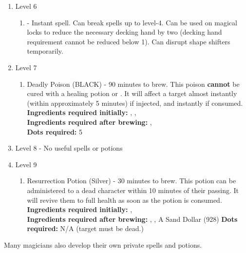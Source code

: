 \documentclass[green]{NeptuneBall}
\begin{document}
\begin{enumerate}
   \item Level 6
    \begin{enumerate}
      \item \aGreaterDispel{} - Instant spell. Can break spells up to level-4. Can be used on magical locks to reduce the necessary decking hand by two (decking hand requirement cannot be reduced below 1). Can disrupt shape shifters temporarily.
    \end{enumerate}
   \item Level 7
    \begin{enumerate}
      \item Deadly Poison (BLACK) - 90 minutes to brew. This poison {\bf cannot} be cured with a healing potion or \aFirstAid{}. It will affect a target almost instantly (within approximately 5 minutes) if injected, and instantly if consumed.\\
      {\bf Ingredients required initially:} \iIceFish{}, \iElectricEel{}, \iSwordfish{}\\
      {\bf Ingredients required after brewing:} \iSnails{}, \iDeepClam{}\\
		  {\bf Dots required:} 5
    \end{enumerate}
   \item Level 8 - No useful spells or potions
   \item Level 9
   	\begin{enumerate}
   	 \item Resurrection Potion (Silver) - 30 minutes to brew. This potion can be administered to a dead character within 10 minutes of their passing. It will revive them to full health as soon as the potion is consumed.\\
   	 {\bf Ingredients required initially:} \iSnails{}, \iPearl{}\\
   	 {\bf Ingredients required after brewing:} \iDrug{}, \iAnglerFish{}, A Sand Dollar (928)
   	 {\bf Dots required:} N/A (target must be dead.)
   	\end{enumerate}
\end{enumerate}
Many magicians also develop their own private spells and potions. \\
\end{document}
